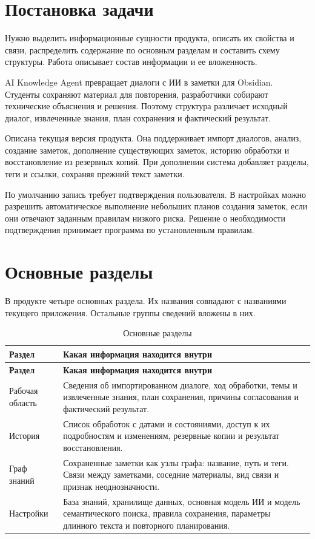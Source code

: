 

\section{Постановка задачи}

Нужно выделить информационные сущности продукта, описать их свойства и связи, распределить содержание по основным разделам и составить схему структуры. Работа описывает состав информации и ее вложенность.


AI Knowledge Agent превращает диалоги с ИИ в заметки для Obsidian. Студенты сохраняют материал для повторения, разработчики собирают технические объяснения и решения. Поэтому структура различает исходный диалог, извлеченные знания, план сохранения и фактический результат.


Описана текущая версия продукта. Она поддерживает импорт диалогов, анализ, создание заметок, дополнение существующих заметок, историю обработки и восстановление из резервных копий. При дополнении система добавляет разделы, теги и ссылки, сохраняя прежний текст заметки.


По умолчанию запись требует подтверждения пользователя. В настройках можно разрешить автоматическое выполнение небольших планов создания заметок, если они отвечают заданным правилам низкого риска. Решение о необходимости подтверждения принимает программа по установленным правилам.


\section{Основные разделы}

В продукте четыре основных раздела. Их названия совпадают с названиями текущего приложения. Остальные группы сведений вложены в них.


{\small\setlength{\tabcolsep}{5pt}\renewcommand{\arraystretch}{1.12}
\begin{longtable}{L{34mm}L{\dimexpr{}\tabcolsep-34mm\relax}}
\caption{Основные разделы}\\
\toprule
\textbf{Раздел} & \textbf{Какая информация находится внутри} \\
\midrule\endfirsthead
\toprule
\textbf{Раздел} & \textbf{Какая информация находится внутри} \\
\midrule\endhead
\bottomrule\endfoot
Рабочая область & Сведения об импортированном диалоге, ход обработки, темы и извлеченные знания, план сохранения, причины согласования и фактический результат. \\[6pt]
История & Список обработок с датами и состояниями, доступ к их подробностям и изменениям, резервные копии и результат восстановления. \\[6pt]
Граф знаний & Сохраненные заметки как узлы графа: название, путь и теги. Связи между заметками, соседние материалы, вид связи и признак неоднозначности. \\[6pt]
Настройки & База знаний, хранилище данных, основная модель ИИ и модель семантического поиска, правила сохранения, параметры длинного текста и повторного планирования. \\[6pt]
\end{longtable}}

